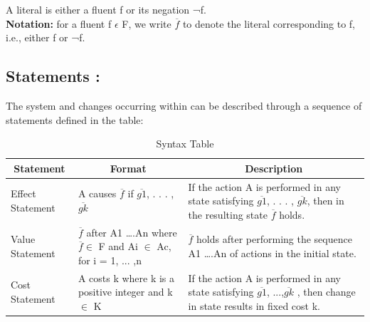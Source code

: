 \documentclass[11pt]{article}
\begin{document}
A literal is either a fluent f or its negation ¬f.\\
\textbf{Notation:} for a fluent f $\epsilon$ F, we write $\overline{f}$ to denote the literal corresponding to f, i.e., either f or ¬f.
\subsection{Statements :}\label{sec:Statements} 
	The system and changes occurring within can be described through a sequence of statements defined in the table:
	\begin{table}[H]
  \centering
    \begin{tabular}{|p{2cm}|p{4cm}|p{9cm}|}
    \hline
    \multicolumn{1}{|c|}{\textbf{Statement}} & \multicolumn{1}{c|}{\textbf{Format}} & \multicolumn{1}{c|}{\textbf{Description}} \\
    \hline
    Effect Statement & A causes $\overline{f}$ if $\overline{g1}$, . . . , $\overline{gk}$ & If the action A is performed in any state satisfying $\overline{g1}$, . . . , $\overline{gk}$, then in
    the resulting state $\overline{f}$ holds. \\
    \hline
    Value Statement & $\overline{f}$ after A1 ….An where $\overline{f} \in$ F and Ai $\in$ Ac, for i = 1, ... ,n & $\overline{f}$ holds after performing the sequence A1 ….An of actions in the initial state. \\
    \hline
    Cost Statement & A costs k where k is a positive integer and k $\in$ K   & If the action A is performed in any state satisfying $\overline{g1}$, ...,$\overline{gk}$ , then change in state results in fixed cost k. \\
    \hline
    \end{tabular}
    \caption{Syntax Table}
  \label{tab:table01}
\end{table}
\end{document}
